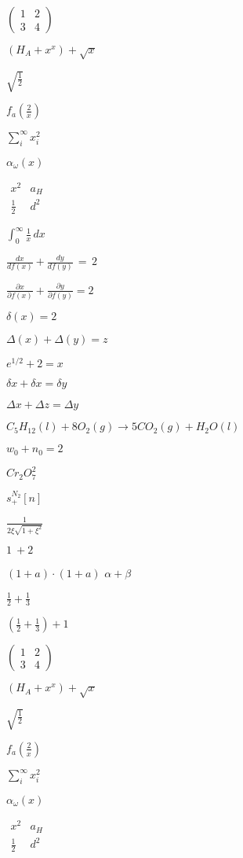 \documentclass{article}
\begin{document}
$\begin{pmatrix} 1 & 2 \\ 3 & 4 \end{pmatrix}$

$(H_A+x^x)+\sqrt{x}$

$\sqrt{\frac{1}{2}}$

$f_a(\frac{2}{x})$


$\sum_i^{\infty} x_i^2$


$\alpha_{\omega}(x)$

$\begin{matrix} x^2 & a_H \\ \frac{1}{2} & d^2 \end{matrix}$


$\int_0^{\infty} \frac{1}{x}\, dx$


$\frac{dx}{df(x)} + \frac{dy}{df(y)}\, =\, 2$


$\frac{\partial x}{\partial f(x)} + \frac{\partial y}{\partial f(y)} = 2$


$\delta (x) = 2$

$\Delta (x) + \Delta (y) = z$

$e^{1/2} + 2 = x$

$\delta x + \delta x = \delta y$

$\Delta x + \Delta z = \Delta y$

$C_5H_{12}(l)+8O_2(g)\rightarrow 5CO_2(g)+H_2O(l)$

$w_0 + n_0 = 2$

$Cr_2O_7^2$

$s^{N_2}_+ [n]$

$\frac{1}{2\xi \sqrt{1+\xi^2}}$

$1\: + 2$

$(1 + a) \cdot (1 + a)$
$\alpha + \beta$

$\frac{1}{2} + \frac{1}{3}$


$(\frac{1}{2} + \frac{1}{3}) + 1$


$\begin{pmatrix} 1 & 2 \\ 3 & 4 \end{pmatrix}$

$(H_A+x^x)+\sqrt{x}$

$\sqrt{\frac{1}{2}}$

$f_a(\frac{2}{x})$


$\sum_i^{\infty} x_i^2$


$\alpha_{\omega}(x)$

$\begin{matrix} x^2 & a_H \\ \frac{1}{2} & d^2 \end{matrix}$
\end{document}
